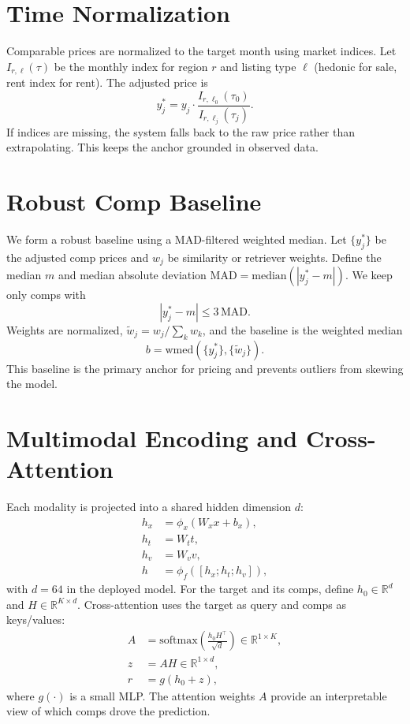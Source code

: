 \documentclass[11pt,a4paper]{article}
\newcommand{\R}{\mathbb{R}}
\newcommand{\softmax}{\mathrm{softmax}}
\begin{document}
\section{Time Normalization}
Comparable prices are normalized to the target month using market indices.
Let $I_{r,\ell}(\tau)$ be the monthly index for region $r$ and listing type
$\ell$ (hedonic for sale, rent index for rent). The adjusted price is
\begin{equation}
 y_j^{\ast} = y_j \cdot \frac{I_{r,\ell_0}(\tau_0)}{I_{r,\ell_j}(\tau_j)}.
\end{equation}
If indices are missing, the system falls back to the raw price rather than
extrapolating. This keeps the anchor grounded in observed data.

\section{Robust Comp Baseline}
We form a robust baseline using a MAD-filtered weighted median. Let
$\{y_j^{\ast}\}$ be the adjusted comp prices and $w_j$ be similarity or
retriever weights. Define the median $m$ and median absolute deviation
$\mathrm{MAD} = \mathrm{median}(|y_j^{\ast} - m|)$. We keep only comps with
\begin{equation}
|y_j^{\ast} - m| \leq 3\,\mathrm{MAD}.
\end{equation}
Weights are normalized, $\tilde{w}_j = w_j / \sum_k w_k$, and the baseline is
the weighted median
\begin{equation}
 b = \mathrm{wmed}\left(\{y_j^{\ast}\}, \{\tilde{w}_j\}\right).
\end{equation}
This baseline is the primary anchor for pricing and prevents outliers from
skewing the model.

\section{Multimodal Encoding and Cross-Attention}
Each modality is projected into a shared hidden dimension $d$:
\begin{align}
 h_x &= \phi_x(W_x x + b_x), \\
 h_t &= W_t t, \\
 h_v &= W_v v, \\
 h &= \phi_f([h_x; h_t; h_v]),
\end{align}
with $d = 64$ in the deployed model. For the target and its comps, define
$h_0 \in \R^d$ and $H \in \R^{K \times d}$. Cross-attention uses the target as
query and comps as keys/values:
\begin{align}
 A &= \softmax\left(\frac{h_0 H^\top}{\sqrt{d}}\right) \in \R^{1 \times K}, \\
 z &= A H \in \R^{1 \times d}, \\
 r &= g(h_0 + z),
\end{align}
where $g(\cdot)$ is a small MLP. The attention weights $A$ provide an
interpretable view of which comps drove the prediction.
\end{document}
